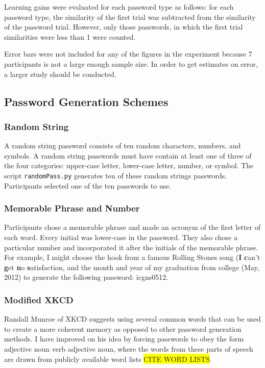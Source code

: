 \documentclass{article}
\newcommand{\hl}[1]
{\colorbox{yellow}{#1}}
\begin{document}
Learning gains were evaluated for each password type as follows: for each password type, the similarity of the first trial was subtracted from the similarity of the password trial. However, only those passwords, in which the first trial similarities were less than 1 were counted. 

Error bars were not included for any of the figures in the experiment because 7 participants is not a large enough sample size. In order to get estimates on error, a larger study should be conducted.



\subsection*{Password Generation Schemes}
\subsubsection*{Random String}
A random string password consists of ten random characters, numbers, and symbols. A random string passwords must have contain at least one of three of the four categories: upper-case letter, lower-case letter, number, or symbol. The script \texttt{randomPass.py} generates ten of these random strings passwords. Participants selected one of the ten passwords to use.


\subsubsection*{Memorable Phrase and Number}
Participants chose a memorable phrase and made an acronym of the first letter of each word. Every initial was lower-case in the password. They also chose a particular number and incorporated it after the initials of the memorable phrase. For example, I might choose the hook from a famous Rolling Stones song (\textbf{I} \textbf{c}an't \textbf{g}et \textbf{n}o \textbf{s}atisfaction, and the month and year of my graduation from college (May, 2012) to generate the following password: icgns0512. 

\subsubsection*{Modified XKCD}
Randall Munroe of XKCD suggests using several common words that can be used to create a more coherent memory as opposed to other password generation methods. I have improved on his idea by forcing passwords to obey the form adjective noun verb adjective noun, where the words from these parts of speech are drawn from publicly available word lists \hl{CITE WORD LISTS}.
\end{document}
